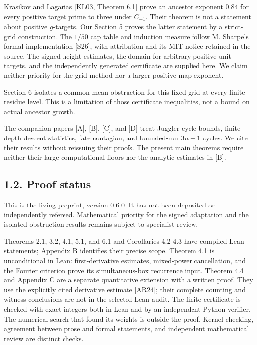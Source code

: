 \documentclass[11pt,a4paper]{article}
\begin{document}
Krasikov and Lagarias {[}KL03, Theorem 6.1{]} prove an ancestor exponent
\(0.84\) for every positive target prime to three under \(C_{+1}\).
Their theorem is not a statement about positive \(g\)-targets. Our
Section 5 proves the latter statement by a strict-grid construction. The
\(1/50\) cap table and induction measure follow M. Sharpe's formal
implementation {[}S26{]}, with attribution and its MIT notice retained
in the source. The signed height estimates, the domain for arbitrary
positive unit targets, and the independently generated certificate are
supplied here. We claim neither priority for the grid method nor a
larger positive-map exponent.

Section 6 isolates a common mean obstruction for this fixed grid at
every finite residue level. This is a limitation of those certificate
inequalities, not a bound on actual ancestor growth.

The companion papers {[}A{]}, {[}B{]}, {[}C{]}, and {[}D{]} treat
Juggler cycle bounds, finite-depth descent statistics, fate contagion,
and bounded-run \(3n-1\) cycles. We cite their results without reissuing
their proofs. The present main theorems require neither their large
computational floors nor the analytic estimates in {[}B{]}.

\subsection{1.2. Proof status}\label{proof-status}

This is the living preprint, version 0.6.0. It has not been deposited or
independently refereed. Mathematical priority for the signed adaptation
and the isolated obstruction results remains subject to specialist
review.

Theorems 2.1, 3.2, 4.1, 5.1, and 6.1 and Corollaries 4.2-4.3 have
compiled Lean statements; Appendix B identifies their precise scope.
Theorem 4.1 is unconditional in Lean: first-derivative estimates,
mixed-power cancellation, and the Fourier criterion prove its
simultaneous-box recurrence input. Theorem 4.4 and Appendix C are a
separate quantitative extension with a written proof. They use the
explicitly cited derivative estimate {[}AR24{]}; their complete counting
and witness conclusions are not in the selected Lean audit. The finite
certificate is checked with exact integers both in Lean and by an
independent Python verifier. The numerical search that found its weights
is outside the proof. Kernel checking, agreement between prose and
formal statements, and independent mathematical review are distinct
checks.
\end{document}
